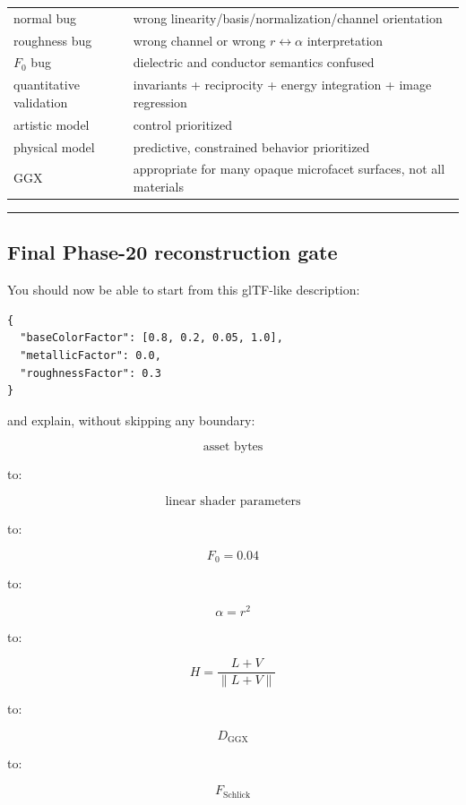 {\begin{longtable}[]{@{}
  >{\raggedright\arraybackslash}p{}
  >{\raggedright\arraybackslash}p{}@{}}
normal bug & wrong linearity/basis/normalization/channel orientation \\
roughness bug & wrong channel or wrong \(r\leftrightarrow\alpha\) interpretation \\
\(F_0\) bug & dielectric and conductor semantics confused \\
quantitative validation & invariants + reciprocity + energy integration + image regression \\
artistic model & control prioritized \\
physical model & predictive, constrained behavior prioritized \\
GGX & appropriate for many opaque microfacet surfaces, not all materials \\
\end{longtable}
}

\begin{center}\rule{0.5\linewidth}{0.5pt}\end{center}

\subsection{Final Phase-20 reconstruction gate}\label{03-visual-computing-i-ch006-final-phase-20-reconstruction-gate}

\hypertarget{03-visual-computing-i-ch006-final-phase-20-reconstruction-gate}{}

You should now be able to start from this glTF-like description:

\begin{verbatim}
{
  "baseColorFactor": [0.8, 0.2, 0.05, 1.0],
  "metallicFactor": 0.0,
  "roughnessFactor": 0.3
}
\end{verbatim}

and explain, without skipping any boundary:

\[
\text{asset bytes}
\]

to:

\[
\text{linear shader parameters}
\]

to:

\[
F_0=0.04
\]

to:

\[
\alpha=r^2
\]

to:

\[
H=\frac{L+V}{\|L+V\|}
\]

to:

\[
D_{\mathrm{GGX}}
\]

to:

\[
F_{\mathrm{Schlick}}
\]

